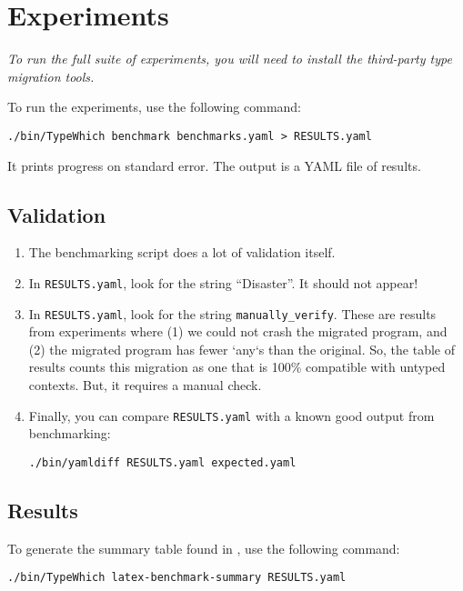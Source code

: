 \documentclass{article}
\begin{document}
\section{Experiments}

\emph{To run the full suite of experiments, you will need to install the
third-party type migration tools.}

To run the experiments, use the following command:

\begin{verbatim}
./bin/TypeWhich benchmark benchmarks.yaml > RESULTS.yaml
\end{verbatim}

It prints progress on standard error. The output is a YAML file of results.

\subsection{Validation}

\begin{enumerate}

\item The benchmarking script does a lot of validation itself.

\item In \texttt{RESULTS.yaml}, look for the string ``Disaster''. It should not
appear!

\item In \texttt{RESULTS.yaml}, look for the string \verb|manually_verify|.
These are results from experiments where (1) we could not crash the migrated
program, and (2) the migrated program has fewer `any`s than the original. So,
the table of results counts this migration as one that is 100\% compatible with
untyped contexts. But, it requires a manual check.

\item Finally, you can compare \texttt{RESULTS.yaml} with a known good output
from benchmarking:

\begin{verbatim}
./bin/yamldiff RESULTS.yaml expected.yaml
\end{verbatim}

\end{enumerate}

\subsection{Results}

To generate the summary table found in \citet{typewhich}, use the following
command:
\begin{verbatim}
./bin/TypeWhich latex-benchmark-summary RESULTS.yaml 
\end{verbatim}
\end{document}
